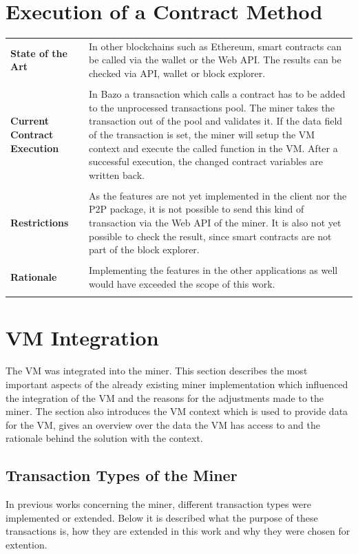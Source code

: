 \section{Execution of a Contract Method}
\begin{tabular}[t]{ p{3cm} p{12.5cm}}
\raggedright
\textbf{State of the Art} &
In other blockchains such as Ethereum, smart contracts can be called via the wallet or the Web API. The results can be checked via API, wallet or block explorer. \\ \\
\raggedright
\textbf{Current Contract Execution} &
In Bazo a transaction which calls a contract has to be added to the unprocessed transactions pool. The miner takes the transaction out of the pool and validates it. If the data field of the transaction is set, the miner will setup the VM context and execute the called function in the VM. After a successful execution, the changed contract variables are written back. \\ \\

\raggedright
\textbf{Restrictions} &
As the features are not yet implemented in the client nor the P2P package, it is not possible to send this kind of transaction via the Web API of the miner. It is also not yet possible to check the result, since smart contracts are not part of the block explorer. \\ \\

\raggedright
\textbf{Rationale} &
Implementing the features in the other applications as well would have exceeded the scope of this work. \\ \\
\end{tabular}

\pagebreak

\section{VM Integration} \label{design_miner}
The VM was integrated into the miner. This section describes the most important aspects of the already existing miner implementation which influenced the integration of the VM and the reasons for the adjustments made to the miner. The section also introduces the VM context which is used to provide data for the VM, gives an overview over the data the VM has access to and the rationale behind the solution with the context.

\subsection{Transaction Types of the Miner} \label{transactionTypes}
In previous works concerning the miner, different transaction types were implemented or extended. Below it is described what the purpose of these transactions is, how they are extended in this work and why they were chosen for extention.

